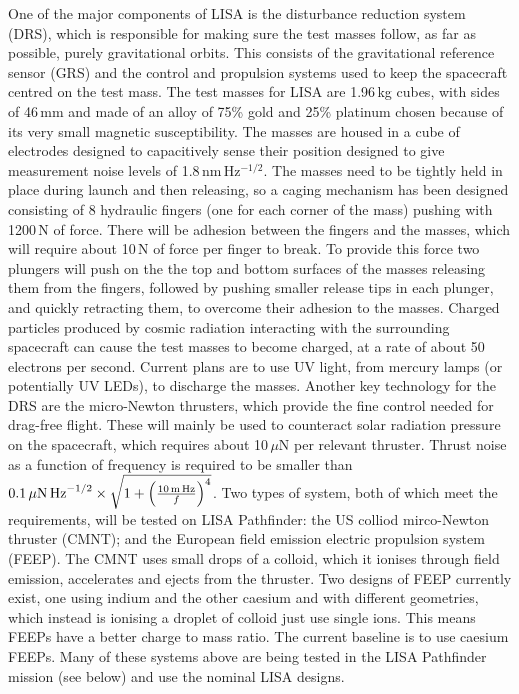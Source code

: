 \documentclass{article}
\begin{document}
One of the major components of LISA is the disturbance reduction system (DRS),
which is responsible for making sure the test masses follow, as far as
possible, purely gravitational orbits. This consists of the gravitational
reference sensor (GRS) and the control and propulsion systems used to keep the
spacecraft centred on the test mass. The test masses for LISA are 1.96\,kg
cubes, with sides of 46\,mm and made of an alloy of 75\% gold and 25\% platinum
chosen because of its very small magnetic susceptibility. The masses are housed
in a cube of electrodes designed to capacitively sense their position designed
to give measurement noise levels of 1.8\,nm\,Hz$^{-1/2}$. The masses need to be
tightly held in place during launch and then releasing, so a caging mechanism
has been designed consisting of 8 hydraulic fingers (one for each corner of the
mass) pushing with 1200\,N of force. There will be adhesion between the fingers
and the masses, which will require about 10\,N of force per finger to break. To
provide this force two plungers will push on the the top and bottom surfaces of
the masses releasing them from the fingers, followed by pushing smaller release
tips in each plunger, and quickly retracting them, to overcome their adhesion to
the masses. Charged particles produced by cosmic radiation interacting with the
surrounding spacecraft can cause the test masses to become charged, at a rate of
about 50 electrons per second. Current plans are to use UV light, from mercury
lamps (or potentially UV LEDs), to discharge the masses. Another key technology
for the DRS are the micro-Newton thrusters, which provide the fine control
needed for drag-free flight. These will mainly be used to counteract solar
radiation pressure on the spacecraft, which requires about 10\,$\mu$N per
relevant thruster. Thrust noise as a function of frequency is required to be
smaller than $0.1\,\mu{\rm N}\,{\rm
Hz}^{-1/2}\times\sqrt{1+\left(\frac{10\,{\rm m}\,{\rm Hz}}{f}\right)^4}$. Two
types of system, both of which meet the requirements, will be tested on LISA
Pathfinder: the US colliod mirco-Newton thruster (CMNT); and the European field
emission electric propulsion system (FEEP). The CMNT uses small drops of a
colloid, which it ionises through field emission, accelerates and ejects from
the thruster. Two designs of FEEP currently exist, one using indium and the
other caesium and with different geometries, which instead is ionising a droplet
of colloid just use single ions. This means FEEPs have a better charge to mass
ratio. The current baseline is to use caesium FEEPs. Many of these systems above
are being tested in the LISA Pathfinder mission (see below) and use the nominal
LISA designs.
\end{document}

